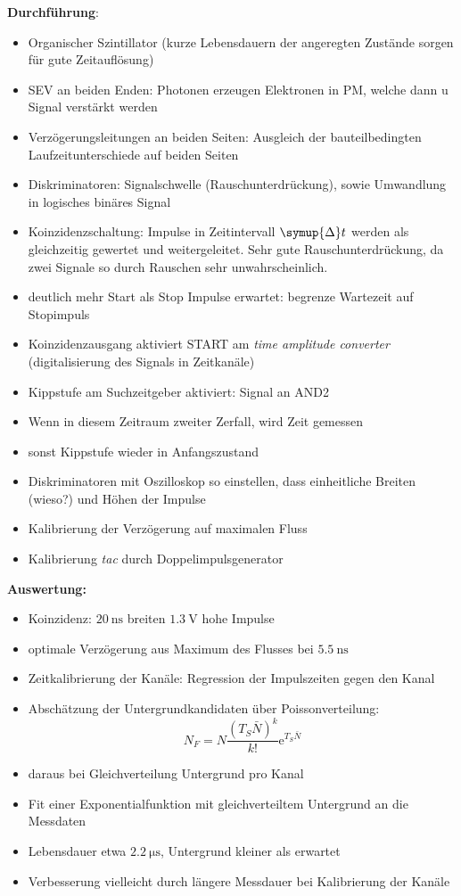 \textbf{Durchführung}:
\begin{itemize}
    \item Organischer Szintillator (kurze Lebensdauern der angeregten Zustände sorgen für gute Zeitauflösung)
    \item SEV an beiden Enden: Photonen erzeugen Elektronen in PM, welche dann u Signal verstärkt werden
    \item Verzögerungsleitungen an beiden Seiten: Ausgleich der bauteilbedingten Laufzeitunterschiede auf beiden Seiten
    \item Diskriminatoren: Signalschwelle (Rauschunterdrückung), sowie Umwandlung in logisches binäres Signal
    \item Koinzidenzschaltung: Impulse in Zeitintervall $\symup{\Delta}t$ werden als gleichzeitig gewertet und weitergeleitet. Sehr gute Rauschunterdrückung, da zwei Signale so durch Rauschen sehr unwahrscheinlich.
    \item deutlich mehr Start als Stop Impulse erwartet: begrenze Wartezeit auf Stopimpuls
    \item Koinzidenzausgang aktiviert START am \textit{time amplitude converter} (digitalisierung des Signals in Zeitkanäle)
    \item Kippstufe am Suchzeitgeber aktiviert: Signal an AND2
    \item Wenn in diesem Zeitraum zweiter Zerfall, wird Zeit gemessen
    \item sonst Kippstufe wieder in Anfangszustand
    \item Diskriminatoren mit Oszilloskop so einstellen, dass einheitliche Breiten (wieso?) und Höhen der Impulse
    \item Kalibrierung der Verzögerung auf maximalen Fluss
    \item Kalibrierung \textit{tac} durch Doppelimpulsgenerator
\end{itemize}

\textbf{Auswertung:}
\begin{itemize}
    \item Koinzidenz: $\SI{20}{\nano\second}$ breiten $\SI{1.3}{\volt}$ hohe Impulse
    \item optimale Verzögerung aus Maximum des Flusses bei $\SI{5,5}{\nano\second}$
    \item Zeitkalibrierung der Kanäle: Regression der Impulszeiten gegen den Kanal
    \item Abschätzung der Untergrundkandidaten über Poissonverteilung:
        \begin{equation}
            N_F = N\frac{(T_S\bar{N})^k}{k!}\text{e}^{T_S\bar{N}}
        \end{equation}
    \item daraus bei Gleichverteilung Untergrund pro Kanal
    \item Fit einer Exponentialfunktion mit gleichverteiltem Untergrund an die Messdaten
    \item Lebensdauer etwa $\SI{2,2}{\micro\second}$, Untergrund kleiner als erwartet
    \item Verbesserung vielleicht durch längere Messdauer bei Kalibrierung der Kanäle
\end{itemize}
